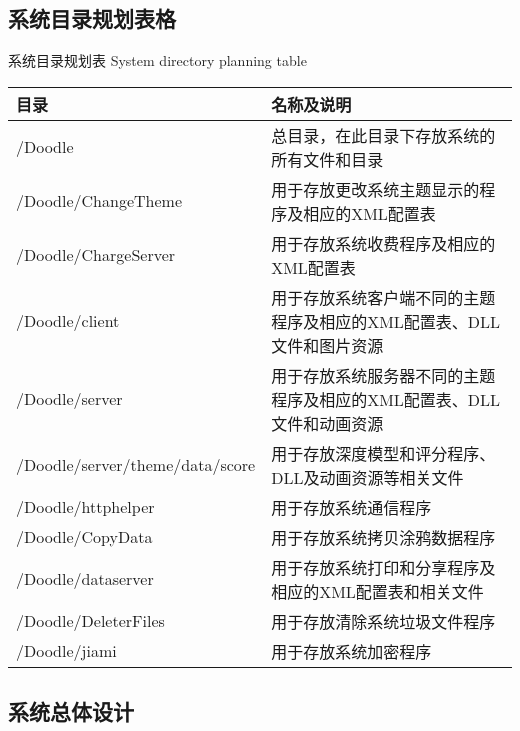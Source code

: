 \documentclass[12pt]{zjutthesis}
\begin{document}
\subsection{系统目录规划表格}
\begin{table}[htp]
  \centering
  \bicaption
    {系统目录规划表}
    {System directory planning table}
  \begin{tabular}{m{4cm}m{8cm}}
    \toprule
    目录                              & 名称及说明                                 \\
    \midrule
    /Doodle                         & 总目录，在此目录下存放系统的所有文件和目录                 \\
    /Doodle/ChangeTheme             & 用于存放更改系统主题显示的程序及相应的XML配置表             \\
    /Doodle/ChargeServer            & 用于存放系统收费程序及相应的XML配置表                  \\
    /Doodle/client                  & 用于存放系统客户端不同的主题程序及相应的XML配置表、DLL文件和图片资源 \\
    /Doodle/server                  & 用于存放系统服务器不同的主题程序及相应的XML配置表、DLL文件和动画资源 \\
    /Doodle/server/theme/data/score & 用于存放深度模型和评分程序、DLL及动画资源等相关文件           \\
    /Doodle/httphelper              & 用于存放系统通信程序                            \\
    /Doodle/CopyData                & 用于存放系统拷贝涂鸦数据程序                        \\
    /Doodle/dataserver              & 用于存放系统打印和分享程序及相应的XML配置表和相关文件          \\
    /Doodle/DeleterFiles            & 用于存放清除系统垃圾文件程序                        \\
    /Doodle/jiami                   & 用于存放系统加密程序                            \\
    \bottomrule
  \end{tabular}
\end{table}

\subsection{系统总体设计}
\end{document}
